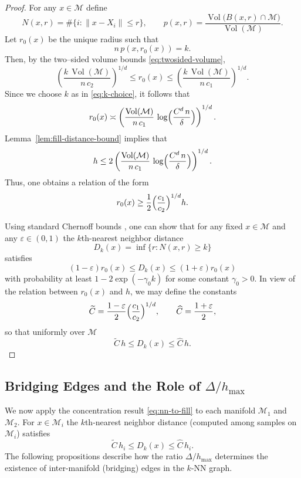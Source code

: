 \documentclass{article}
\theoremstyle{plain}
\theoremstyle{definition}
\theoremstyle{remark}
\begin{document}
\begin{proof}
For any \(x\in \mathcal{M}\) define
\[
N(x,r)=\#\{i: \|x-X_i\|\le r\},\qquad
p(x,r)=\frac{\operatorname{Vol}\bigl(B(x,r)\cap \mathcal{M}\bigr)}{\operatorname{Vol}(\mathcal{M})}.
\]
Let \(r_0(x)\) be the unique radius such that
\[
n\,p(x,r_0(x)) = k.
\]
Then, by the two--sided volume bounds \eqref{eq:twosided-volume},
\[
\left(\frac{k\,\operatorname{Vol}(\mathcal{M})}{n\,c_2}\right)^{1/d} \le r_0(x) \le \left(\frac{k\,\operatorname{Vol}(\mathcal{M})}{n\,c_1}\right)^{1/d}.
\]
Since we choose \(k\) as in \eqref{eq:k-choice}, it follows that
\[
r_0(x) \asymp \left(\frac{\operatorname{Vol}(\mathcal{M})}{n\,c_1}\,\log\Bigl(\frac{C^d\,n}{\delta}\Bigr)\right)^{1/d}.
\]
Lemma~\ref{lem:fill-distance-bound} implies that
\[
h \le 2\left(\frac{\operatorname{Vol}(\mathcal{M})}{n\,c_1}\,\log\Bigl(\frac{C^d\,n}{\delta}\Bigr)\right)^{1/d}.
\]
Thus, one obtains a relation of the form
\[
r_0(x) \ge \frac{1}{2}\Bigl(\frac{c_1}{c_2}\Bigr)^{1/d} h.
\]

Using standard Chernoff bounds
, one can show that for any fixed \(x\in \mathcal{M}\) and any \(\varepsilon\in (0,1)\) the \(k\)th-nearest neighbor distance
\[
D_k(x)=\inf\{r: N(x,r)\ge k\}
\]
satisfies
\begin{equation}\label{eq:nn-concentration}
(1-\varepsilon)r_0(x) \le D_k(x) \le (1+\varepsilon)r_0(x)
\end{equation}
with probability at least \(1-2\exp(-\gamma_0 k)\) for some constant \(\gamma_0>0\). In view of the relation between \(r_0(x)\) and \(h\), we may define the constants
\[
\widetilde{C} = \frac{1-\varepsilon}{2}\Bigl(\frac{c_1}{c_2}\Bigr)^{1/d}, \qquad
\widehat{C} = \frac{1+\varepsilon}{2},
\]
so that uniformly over \(\mathcal{M}\)
\begin{equation}\label{eq:nn-to-fill}
\widetilde{C}\,h \le D_k(x) \le \widehat{C}\,h.
\end{equation}
\end{proof}

\subsection{Bridging Edges and the Role of \(\Delta/h_{\max}\)}

We now apply the concentration result \eqref{eq:nn-to-fill} to each manifold \(\mathcal{M}_1\) and \(\mathcal{M}_2\). For \(x\in \mathcal{M}_i\) the \(k\)th-nearest neighbor distance (computed among samples on \(\mathcal{M}_i\)) satisfies
\[
\widetilde{C}\,h_i \le D_k(x) \le \widehat{C}\,h_i.
\]
The following propositions describe how the ratio \(\Delta/h_{\max}\) determines the existence of inter-manifold (bridging) edges in the \(k\)-NN graph.
\end{document}
